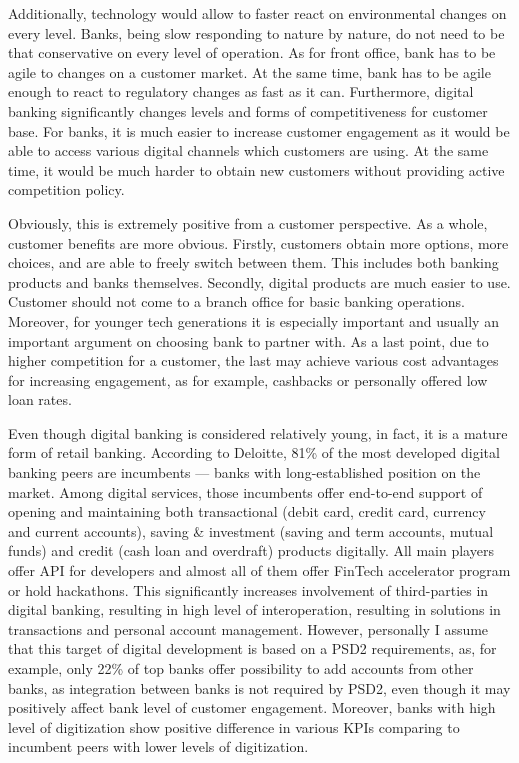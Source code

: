 Additionally, technology would allow to faster react on environmental changes on every level.
Banks, being slow responding to nature by nature, do not need to be that conservative on every level of operation. As for front office, bank has to be agile to changes on a customer market. At the same time, bank has to be agile enough to react to regulatory changes as fast as it can.
Furthermore, digital banking significantly changes levels and forms of competitiveness for customer base. For banks, it is much easier to increase customer engagement as it would be able to access various digital channels which customers are using. At the same time, it would be much harder to obtain new customers without providing active competition policy.

Obviously, this is extremely positive from a customer perspective.
As a whole, customer benefits are more obvious.
Firstly, customers obtain more options, more choices, and are able to freely switch between them. This includes both banking products and banks themselves.
Secondly, digital products are much easier to use. Customer should not come to a branch office for basic banking operations. Moreover, for younger tech generations it is especially important and usually an important argument on choosing bank to partner with. 
As a last point, due to higher competition for a customer, the last may achieve various cost advantages for increasing engagement, as for example, cashbacks or personally offered low loan rates.
\cite{what_is_digital_banking}


Even though digital banking is considered relatively young, in fact, it is a mature form of retail banking.
According to Deloitte, 81\% of the most developed digital banking peers are incumbents — banks with long-established position on the market.
Among digital services, those incumbents offer end-to-end support of opening and maintaining both transactional (debit card, credit card, currency and current accounts), saving \& investment (saving and term accounts, mutual funds) and credit (cash loan and overdraft) products digitally.
All main players offer API for developers and almost all of them offer FinTech accelerator program or hold hackathons. 
This significantly increases involvement of third-parties in digital banking, resulting in high level of interoperation, resulting in solutions in transactions and personal account management.
However, personally I assume that this target of digital development is based on a PSD2 requirements, as, for example, only 22\% of top banks offer possibility to add accounts from other banks, as integration between banks is not required by PSD2, even though it may positively affect bank level of customer engagement.
Moreover, banks with high level of digitization show positive difference in various KPIs comparing to incumbent peers with lower levels of digitization.
\cite{digital_banking_maturity}


